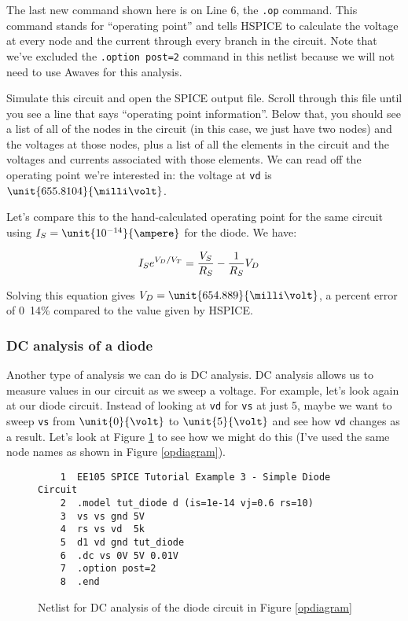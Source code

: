 \documentclass{article}
\begin{document}
The last new command shown here is on Line 6, the \verb|.op| command. This command stands for ``operating point'' and tells HSPICE to calculate the voltage at every node and the current through every branch in the circuit. Note that we've excluded the \verb|.option post=2| command in this netlist because we will not need to use Awaves for this analysis.

Simulate this circuit and open the SPICE output file. Scroll through this file until you see a line that says ``operating point information''. Below that, you should see a list of all of the nodes in the circuit (in this case, we just have two nodes) and the voltages at those nodes, plus a list of all the elements in the circuit and the voltages and currents associated with those elements. We can read off the operating point we're interested in: the voltage at \verb|vd| is $\unit{655.8104}{\milli\volt}$.

Let's compare this to the hand-calculated operating point for the same circuit using $I_S = \unit{10^{-14}}{\ampere}$ for the diode. We have:

\begin{align*}
  I_S e^{V_D/V_T} &= \frac{V_S}{R_S} - \frac{1}{R_S}V_D
\end{align*}

Solving this equation gives $V_D = \unit{654.889}{\milli\volt}$, a percent error of \unit{0.14}{\%} compared to the value given by HSPICE.

\subsubsection{DC analysis of a diode}

Another type of analysis we can do is DC analysis. DC analysis allows us to measure values in our circuit as we sweep a voltage. For example, let's look again at our diode circuit. Instead of looking at \verb|vd| for \verb|vs| at just \unit{5}{\volt}, maybe we want to sweep \verb|vs| from $\unit{0}{\volt}$ to $\unit{5}{\volt}$ and see how \verb|vd| changes as a result. Let's look at Figure \ref{dcnetlist} to see how we might do this (I've used the same node names as shown in Figure \ref{opdiagram}).

\begin{figure}[!htb]
  \begin{verbatim}
    1  EE105 SPICE Tutorial Example 3 - Simple Diode Circuit
    2  .model tut_diode d (is=1e-14 vj=0.6 rs=10)
    3  vs vs gnd 5V
    4  rs vs vd  5k
    5  d1 vd gnd tut_diode
    6  .dc vs 0V 5V 0.01V
    7  .option post=2
    8  .end \end{verbatim}
  \caption{Netlist for DC analysis of the diode circuit in Figure \ref{opdiagram}}
  \label{dcnetlist}
\end{figure}
\end{document}
